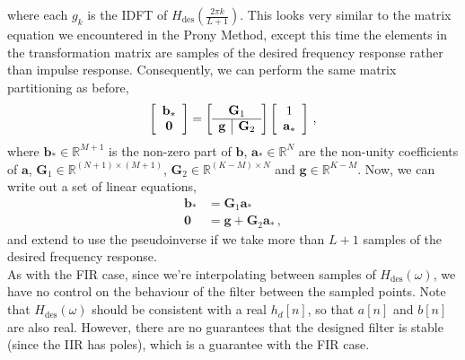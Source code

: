 %
where each $g_k$ is the IDFT of $H_\mathrm{des}\left(\frac{2\pi k}{L + 1}\right)$.
This looks very similar to the matrix equation we encountered in the Prony Method,
except this time the elements in the transformation matrix are samples of
the desired frequency response rather than impulse response. Consequently,
we can perform the same matrix partitioning as before,
%
\begin{displaymath}
  \left[\begin{array}{c}\mathbf{b}_* \\ \mathbf{0} \end{array}\right] =
  \left[\begin{array}{c|c}
      \multicolumn{2}{c}{\mathbf{G}_1} \\
      \hline
      \mathbf{g} & \mathbf{G}_2
    \end{array}\right]
  \left[\begin{array}{c}1 \\ \mathbf{a}_* \end{array}\right] \,,
\end{displaymath}
%
where $\mathbf{b}_*\in\mathbb{R}^{M+1}$ is the non-zero part of $\mathbf{b}$,
$\mathbf{a}_*\in\mathbb{R}^N$ are the non-unity coefficients of $\mathbf{a}$,
$\mathbf{G}_1\in\mathbb{R}^{(N+1)\times(M+1)}$,
$\mathbf{G}_2\in\mathbb{R}^{(K-M)\times N}$ and $\mathbf{g}\in\mathbb{R}^{K-M}$.
Now, we can write out a set of linear equations,
%
\begin{align*}
  \mathbf{b}_* &= \mathbf{G}_1\mathbf{a}_* \\
  \mathbf{0} &= \mathbf{g} + \mathbf{G}_2\mathbf{a}_* \,,
\end{align*}
%
and extend to use the pseudoinverse if we take more than $L+1$ samples of
the desired frequency response.\\
%
As with the FIR case, since we're interpolating between samples of
$H_\mathrm{des}(\omega)$, we have no control on the behaviour of the
filter between the sampled points.
Note that $H_\mathrm{des}(\omega)$ should be consistent with a real $h_d[n]$, so
that $a[n]$ and $b[n]$ are also real. However, there are no guarantees that
the designed filter is stable (since the IIR has poles), which is a guarantee
with the FIR case.

